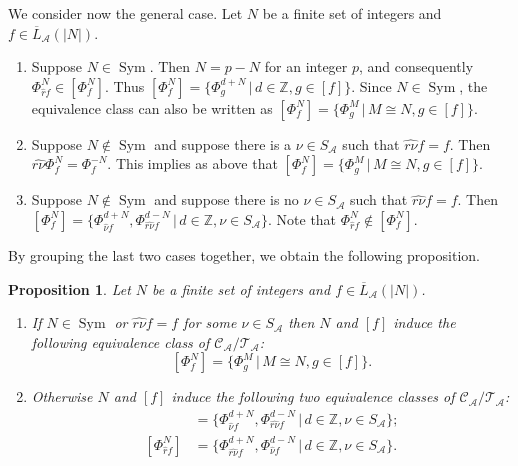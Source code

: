 \documentclass[11pt,a4paper]{article}
\newcommand{\rev}[1]{{\color{blue}#1}}
\newcommand{\rev}[1]{{\color{black}#1}}
\newcommand{\Sym}{\mathop{\mathrm{Sym}}}
\newtheorem{prop}{Proposition}
\begin{document}
We consider now the general case.
Let $N$ be a finite set of integers and $f \in \overline{L}_\mathcal{A}(|N|)$.

\begin{enumerate}

\item Suppose $N \in \Sym$.
Then $N = p -N$ \rev{for an integer $p$}, and consequently $\Phi^{N}_{\hat{r}f} \in [\Phi^{N}_f]$.
Thus $[\Phi^N_f] = \{\Phi^{d+N}_g \, | \, d \in \mathbb{Z}, g \in [f] \}$.
Since $N \in \Sym$, the equivalence class can also be written as
$[\Phi^N_f] = \{\Phi^{M}_g \, | \, M \cong N, g \in [f] \}$.

\item Suppose $N \not\in \Sym$ and suppose there is a $\nu \in S_\mathcal{A}$ such
that $\widehat{r\nu}f = f$.
Then $\widehat{r\nu} \Phi^N_f = \Phi^{-N}_f$.
This implies as above that
$[\Phi^N_f] = \{\Phi^{M}_g \, | \, M \cong N, g \in [f] \}$.

\item Suppose $N \not\in \Sym$ and suppose there is no $\nu \in S_\mathcal{A}$
such that $\widehat{r\nu}f =f$.
Then $[\Phi^N_f] = \{ \Phi^{d+N}_{\hat{\nu}f},  \Phi^{d-N}_{\widehat{r\nu}f} \, | \, d \in \mathbb{Z},
\nu \in S_\mathcal{A} \}$.
Note that $\Phi^N_{\hat{r}f} \not\in [\Phi^N_f]$.

\end{enumerate}
By grouping the last two cases together, we obtain the following proposition.
\begin{prop}
\label{prop:global-eq}
Let $N$ be a finite set of integers and $f \in \overline{L}_\mathcal{A}(|N|)$.
\begin{enumerate}[label=(\roman*)]
\item
\label{prop:global-eq-1}
If $N \in \Sym$ or $\widehat{r\nu}f = f$ for some $\nu \in S_\mathcal{A}$ then
$N$ and $[f]$ induce the following equivalence class of $\mathcal{C}_\mathcal{A} / \mathcal{T}_\mathcal{A}$:
\[
[\Phi^N_f] = \{\Phi^{M}_g \, | \, M \cong N, g \in [f] \}.
\]
\item
\label{prop:global-eq-2}
Otherwise $N$ and $[f]$ induce the following two equivalence classes of $\mathcal{C}_\mathcal{A} / \mathcal{T}_\mathcal{A}$:
\begin{align*}
[\Phi^N_f] & = \{ \Phi^{d+N}_{\hat{\nu}f},  \Phi^{d-N}_{\widehat{r\nu}f} \, | \, d \in \mathbb{Z},
\nu \in S_\mathcal{A} \}; \\
[\Phi^N_{\hat{r}f}] & = \{ \Phi^{d+N}_{\widehat{r\nu}f},  \Phi^{d-N}_{\hat{\nu}f} \, | \, d \in \mathbb{Z},
\nu \in S_\mathcal{A} \}.
\end{align*}
\end{enumerate}
\end{prop}
\end{document}
